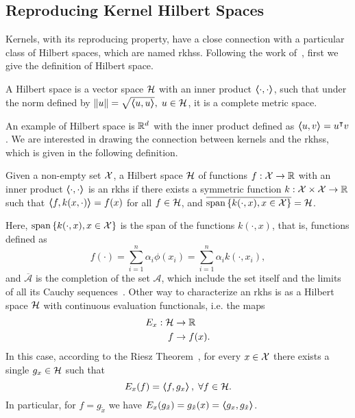 \subsection{Reproducing Kernel Hilbert Spaces}
%
Kernels, with its reproducing property, have a close connection with a particular class of Hilbert spaces, which are named \acrfull{rkhss}. Following the work of~\citet{ScholkopfS02}, first we give the definition of Hilbert space.
%
\begin{definition}
    A Hilbert space is a vector space $\mathcal{H}$ with an inner product $\bm{\left\langle} \cdot, \cdot \bm{\right\rangle}$, such that under the norm defined by $\left\lVert u\right\rVert = \sqrt{\bm{\left\langle} u, u \bm{\right\rangle}}, \; u \in \mathcal{H}$, it is a complete metric space.
\end{definition}
%
An example of Hilbert space is $\mathbb{R}^d$ with the inner product defined as $\bm{\left\langle} u, v \bm{\right\rangle} = u^\intercal v$.
%
We are interested in drawing the connection between kernels and the \acrshort{rkhss}, which is given in the following definition.
\begin{definition}
    Given a non-empty set $\mathcal{X}$, a Hilbert space $\mathcal{H}$ of functions $f: \mathcal{X} \to \mathbb{R}$ with an inner product $\bm{\left\langle} \cdot, \cdot \bm{\right\rangle}$ is an \acrshort{rkhs} if there exists a symmetric function $k: \mathcal{X} \times \mathcal{X} \to \mathbb{R}$ such that $\bm{\left\langle} f, k(x, \cdot) \bm{\right\rangle} = f(x)$ for all $f \in \mathcal{H}$, and $\overline{\operatorname{span}{\left\{k(\cdot, x), x \in \mathcal{X}\right\}}} = \mathcal{H}$. 
\end{definition}
Here, $\operatorname{span}{\left\{k(\cdot, x), x \in \mathcal{X}\right\}}$ is the span of the functions $k(\cdot, x)$, that is, functions defined as
$$ f(\cdot) = \sum_{i=1}^n \alpha_i \phi(x_i) =\sum_{i=1}^n \alpha_i k(\cdot, x_i), $$
and $\overline{\mathcal{A}}$ is the completion of the set $\mathcal{A}$, which include the set itself and the limits of all its Cauchy sequences~\citep{kelley2017general}.
Other way to characterize an \acrshort{rkhs} is as a Hilbert space $\mathcal{H}$ with continuous evaluation functionals, i.e. the maps
\begin{equation}
            \begin{aligned}
        \nonumber
        E_{x}: \mathcal{H} &\to \mathbb{R} \\
        f &\to f(x) .
    \end{aligned}
\end{equation}
In this case, according to the Riesz Theorem~\citep{Whittaker1991ACI}, for every $x \in \mathcal{X}$ there exists a single $g_x \in \mathcal{H}$ such that
$$ E_x(f) = \bm{\left\langle} f, g_x \bm{\right\rangle}, \; \forall f \in \mathcal{H}.$$
In particular, for $f = g_{\tilde{x}}$ we have $E_x(g_{\tilde{x}}) = g_{{\tilde{x}}}(x) = \bm{\left\langle} g_x, g_{\tilde{x}} \bm{\right\rangle}$. 

